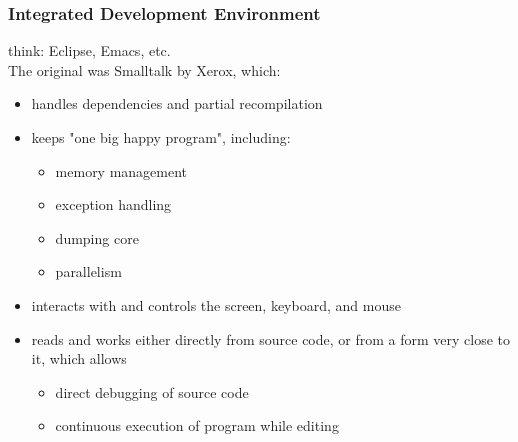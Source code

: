 \documentclass[../../lecture_notes.tex]{subfiles}
\begin{document}
\subsubsection*{Integrated Development Environment}
think: Eclipse, Emacs, etc.\\
The original was Smalltalk by Xerox, which:
	\begin{itemize} [itemsep=0mm]
		\item handles dependencies and partial recompilation
		\item keeps "one big happy program", including:
			\begin{itemize} [itemsep=0mm]
				\item memory management
				\item exception handling
				\item dumping core
				\item parallelism
			\end{itemize}
		\item interacts with and controls the screen, keyboard, and mouse
		\item reads and works either directly from source code, or from a form very close to it, which allows
			\begin{itemize} [itemsep=0mm]
				\item direct debugging of source code
				\item continuous execution of program while editing
			\end{itemize}
		\end{itemize}
\end{document}
